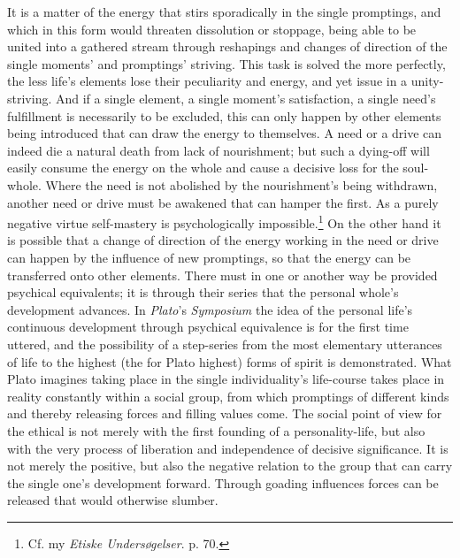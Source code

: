 \documentclass[12pt,a4paper]{book}
\newcommand{\opage}[1]{\marginnote{\footnotesize\textit{[#1]}}}
\begin{document}
It is a matter of the energy that stirs sporadically in the single promptings, and which in this form
would threaten dissolution or stoppage, being able to be united into a gathered stream through
reshapings and changes of direction of the single moments' and promptings' striving. This task is solved
the more perfectly, the less life's elements lose their peculiarity and energy, and yet issue in a
unity-striving. And if a single element, a single moment's satisfaction, a single need's fulfillment is
necessarily to be excluded, this can only happen by other elements being introduced that can draw the
energy to themselves. A need or a drive can indeed die a natural death from lack of nourishment; but such
a dying-off will easily consume the energy on the whole and cause a decisive loss for the soul-whole.
Where the need is not abolished by the nourishment's being \opage{352}withdrawn, another need or drive must be
awakened that can hamper the first. As a purely negative virtue self-mastery is psychologically
impossible.\footnote{Cf. my \emph{Etiske Undersøgelser}. p. 70.} On the other hand it is possible that a
change of direction of the energy working in the need or drive can happen by the influence of new
promptings, so that the energy can be transferred onto other elements. There must in one or another way
be provided psychical equivalents; it is through their series that the personal whole's development
advances. In \emph{Plato}'s \emph{Symposium} the idea of the personal life's continuous development
through psychical equivalence is for the first time uttered, and the possibility of a step-series from
the most elementary utterances of life to the highest (the for Plato highest) forms of spirit is
demonstrated. What Plato imagines taking place in the single individuality's life-course takes place in
reality constantly within a social group, from which promptings of different kinds and thereby releasing
forces and filling values come. The social point of view for the ethical is not merely with the first
founding of a personality-life, but also with the very process of liberation and independence of decisive
significance. It is not merely the positive, but also the negative relation to the group that can carry
the single one's development forward. Through goading influences forces can be released that would
otherwise slumber.
\end{document}
